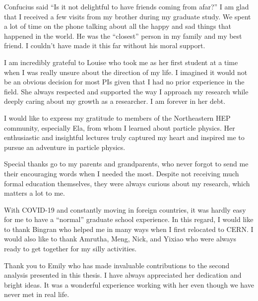 \begin{acknowledgments}

Confucius said ``Is it not delightful to have friends coming from afar?'' I am glad that I received a few visits from my brother during my graduate study. We spent a lot of time on the phone talking about all the happy and sad things that happened in the world. He was the ``closest'' person in my family and my best friend. I couldn’t have made it this far without his moral support.

I am incredibly grateful to Louise who took me as her first student at a time when I was really unsure about the direction of my life. I imagined it would not be an obvious decision for most PIs given that I had no prior experience in the field. She always respected and supported the way I approach my research while deeply caring about my growth as a researcher. I am forever in her debt.  

I would like to express my gratitude to members of the Northeastern HEP community, especially Ela, from whom I learned about particle physics. Her enthusiastic and insightful lectures truly captured my heart and inspired me to pursue an adventure in particle physics.

Special thanks go to my parents and grandparents, who never forgot to send me their encouraging words when I needed the most. Despite not receiving much formal education themselves, they were always curious about my research, which matters a lot to me.

With COVID-19 and constantly moving in foreign countries, it was hardly easy for me to have a ``normal'' graduate school experience. In this regard, I would like to thank Bingran who helped me in many ways when I first relocated to CERN. I would also like to thank Amrutha, Meng, Nick, and Yixiao who were always ready to get together for my silly activities. 

Thank you to Emily who has made invaluable contributions to the second analysis presented in this thesis. I have always appreciated her dedication and bright ideas. It was a wonderful experience working with her even though we have never met in real life.

\end{acknowledgments}